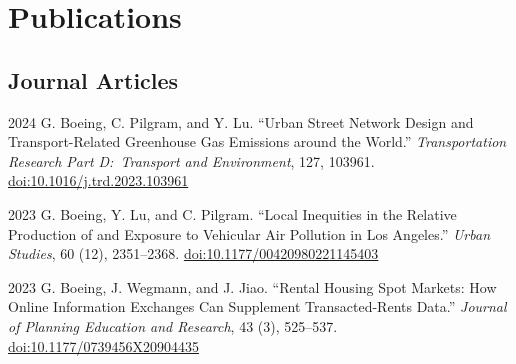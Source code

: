 \documentclass[11pt,letterpaper]{report}
\begin{document}
    \section*{Publications}

    \subsection*{Journal Articles}

    \begin{tablist}




        \item[2024] \tab{}G. Boeing, C. Pilgram, and Y. Lu. \enquote{Urban Street Network Design and Transport-Related Greenhouse Gas Emissions around the World.} \textit{Transportation Research Part D:\ Transport and Environment}, 127, 103961. \href{https://doi.org/10.1016/j.trd.2023.103961}{doi:10.1016/j.trd.2023.103961}

        \item[2023] \tab{}G. Boeing, Y. Lu, and C. Pilgram. \enquote{Local Inequities in the Relative Production of and Exposure to Vehicular Air Pollution in Los Angeles.} \textit{Urban Studies}, 60 (12), 2351--2368. \href{https://doi.org/10.1177/00420980221145403}{doi:10.1177/00420980221145403}

        \item[2023] \tab{}G. Boeing, J. Wegmann, and J. Jiao. \enquote{Rental Housing Spot Markets: How Online Information Exchanges Can Supplement Transacted-Rents Data.} \textit{Journal of Planning Education and Research}, 43 (3), 525--537. \href{https://doi.org/10.1177/0739456X20904435}{doi:10.1177/0739456X20904435}


\end{tablist}
\end{document}
